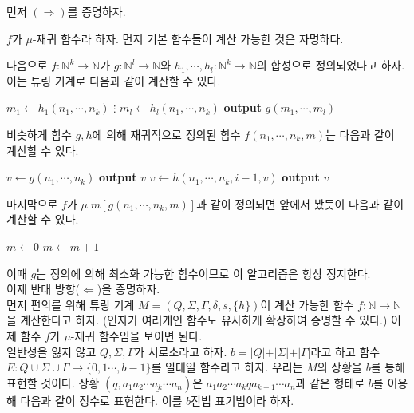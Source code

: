 \documentclass[b5paper, 10pt]{book}
\theoremstyle{definition}
\newenvironment{pf*}{\pushQED{\qed}\pf}{\popQED\endpf}
\begin{document}
\begin{pf*}
    먼저 $(\Rightarrow)$를 증명하자. 

    $f$가 $\mu$-재귀 함수라 하자. 먼저 기본 함수들이 계산 가능한 것은 자명하다. 

    다음으로 $f:\mathbb{N}^k \rightarrow \mathbb{N}$가 
    $g: \mathbb{N}^l \rightarrow \mathbb{N}$와 $h_1, \cdots, h_l:\mathbb{N}^k \rightarrow 
    \mathbb{N}$의 합성으로 정의되었다고 하자. 이는 튜링 기계로 다음과 같이 계산할 수 있다.
    \begin{algorithmic}
        \State $m_1 \gets h_1(n_1, \cdots, n_k)$
        \State $\vdots$
        \State $m_l \gets h_l(n_1, \cdots, n_k)$
        \State \textbf{output} $g(m_1, \cdots, m_l)$
    \end{algorithmic}
    비슷하게 함수 $g, h$에 의해 재귀적으로 정의된 함수 $f(n_1, \cdots, n_k, m)$는 다음과 같이 계산할 수 있다.
    \begin{algorithmic}
        \State $v \gets g(n_1, \cdots, n_k)$
        \State \textbf{output} $v$
        \Else
        \State $v \gets h(n_1, \cdots, n_k, i-1, v)$
        \EndFor
        \State \textbf{output} $v$
        \EndIf
    \end{algorithmic}
    마지막으로 $f$가 $\mu \; m[g(n_1, \cdots, n_k, m)]$과 같이 정의되면 앞에서 봤듯이 
    다음과 같이 계산할 수 있다.
    \begin{algorithmic}
        \State $m \gets 0$
            \State $m \gets m+1$
        \EndWhile
    \end{algorithmic}
    이때 $g$는 정의에 의해 최소화 가능한 함수이므로 이 알고리즘은 항상 정지한다.\\
    이제 반대 방향($\Leftarrow$)을 증명하자.\\
    먼저 편의를 위해 튜링 기계 $M = (Q, \Sigma, \Gamma, \delta,
    s, \{h\})$이 계산 가능한 함수 $f: \mathbb{N} \rightarrow \mathbb{N}$을 
    계산한다고 하자. (인자가 여러개인 함수도 
    유사하게 확장하여 증명할 수 있다.) 이제 함수 $f$가 $\mu$-재귀 함수임을 보이면 된다. \\
    일반성을 잃지 않고 $Q, \Sigma, \Gamma$가 서로소라고 하자. $b = \vert Q \vert + \vert \Sigma \vert 
    + \vert \Gamma \vert$라고 하고 함수 $E:Q \cup \Sigma \cup \Gamma \rightarrow \{0, 1 
    \cdots, b-1\}$를 일대일 함수라고 하자. 우리는 $M$의 상황을 $b$를 통해 표현할 것이다. 상황 $(q,
    a_1a_2 \cdots \underline{a_k} \cdots a_n)$은 $a_1a_2\cdots a_k q a_{k+1} \cdots a_n$과 같은 형태로 
    $b$를 이용해 다음과 같이 정수로 표현한다. 이를 $b$진법 표기법이라 하자. 

\end{pf*}
\end{document}
